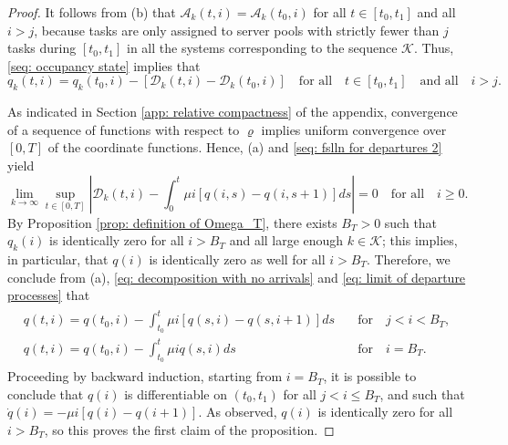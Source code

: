 \documentclass[a4paper, 12pt]{article}
\theoremstyle{definition}
\newcommand{\calA}{\mathcal{A}}
\newcommand{\calD}{\mathcal{D}}
\newcommand{\calK}{\mathcal{K}}
\begin{document}
\begin{proof}
It follows from (b) that $\calA_k(t, i) = \calA_k(t_0, i)$ for all $t \in [t_0, t_1]$ and all $i > j$, because tasks are only assigned to server pools with strictly fewer than $j$ tasks during $[t_0, t_1]$ in all the systems corresponding to the sequence $\calK$. Thus, \eqref{seq: occupancy state} implies that
\begin{equation}
	\label{eq: decomposition with no arrivals}
	q_k(t, i) = q_k(t_0, i) - \left[\calD_k(t, i) - \calD_k(t_0, i)\right] \quad \text{for all} \quad t \in [t_0, t_1] \quad \text{and all} \quad i > j.
\end{equation}

As indicated in Section \ref{app: relative compactness} of the appendix, convergence of a sequence of functions with respect to $\varrho$ implies uniform convergence over $[0, T]$ of the coordinate functions. Hence, (a) and \eqref{seq: fslln for departures 2} yield
\begin{equation}
	\label{eq: limit of departure processes}
	\lim_{k \to \infty} \sup_{t \in [0, T]} \left|\calD_k(t, i) - \int_0^t \mu i \left[q(i, s) - q(i, s + 1)\right]ds\right| = 0 \quad \text{for all} \quad i \geq 0.
\end{equation}
By Proposition \ref{prop: definition of Omega_T}, there exists $B_T > 0$ such that $q_k(i)$ is identically zero for all $i > B_T$ and all large enough $k \in \calK$; this implies, in particular, that $q(i)$ is identically zero as well for all $i > B_T$. Therefore, we conclude from (a), \eqref{eq: decomposition with no arrivals} and \eqref{eq: limit of departure processes} that
\begin{align*}
	\begin{array}{ll}
		\displaystyle q(t, i) = q(t_0, i) - \int_{t_0}^t \mu i\left[q(s, i) - q(s, i + 1)\right]ds & \quad \text{for} \quad j < i < B_T, \\ [3ex]
		\displaystyle q(t, i) = q(t_0, i) - \int_{t_0}^t \mu iq(s, i)ds & \quad \text{for} \quad i = B_T.
	\end{array}
\end{align*}
Proceeding by backward induction, starting from $i = B_T$, it is possible to conclude that $q(i)$ is differentiable on $(t_0, t_1)$ for all $j < i \leq B_T$, and such that $\dot{q}(i) = -\mu i \left[q(i) - q(i + 1)\right]$. As observed, $q(i)$ is identically zero for  all $i > B_T$, so this proves the first claim of the proposition.


\end{proof}
\end{document}
